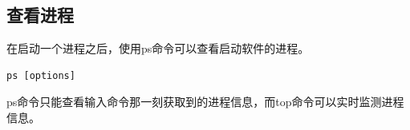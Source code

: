 \documentclass[12pt, openany, oneside]{book}
\begin{document}
\subsection{查看进程}

在启动一个进程之后，使用ps命令可以查看启动软件的进程。

\vspace{-0.5cm}
\begin{lstlisting}
ps [options]
\end{lstlisting}

\begin{table}[H]
	\centering
	\caption{ps参数说明}
\end{table}

ps命令只能查看输入命令那一刻获取到的进程信息，而top命令可以实时监测进程信息。
\end{document}
